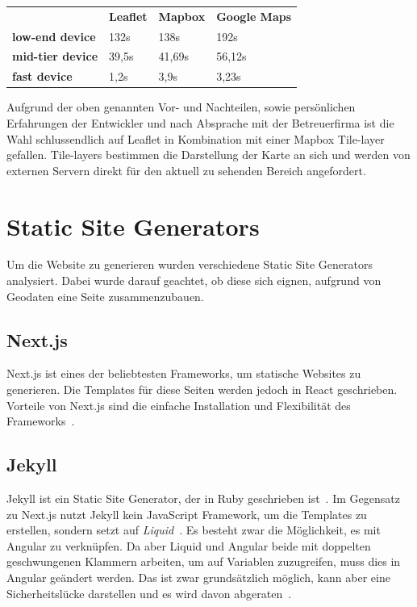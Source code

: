 \begin{table}[hbt!]
    \centering
    \begin{tabular}{llll}
        & \textbf{Leaflet} & \textbf{Mapbox} & \textbf{Google Maps} \\
        \textbf{low-end device}  & 132s             & 138s            & 192s                 \\
        \textbf{mid-tier device} & 39,5s            & 41,69s          & 56,12s               \\
        \textbf{fast device}     & 1,2s             & 3,9s            & 3,23s
    \end{tabular}\label{tab:map-framework-table}
\end{table}

Aufgrund der oben genannten Vor- und Nachteilen, sowie persönlichen Erfahrungen der Entwickler und nach Absprache mit der
Betreuerfirma ist die Wahl schlussendlich auf Leaflet in Kombination mit einer Mapbox Tile-layer gefallen.
Tile-layers bestimmen die Darstellung der Karte an sich und werden von externen Servern direkt für den aktuell zu sehenden Bereich angefordert.

\cleardoublepage

\section{Static Site Generators}
Um die Website zu generieren wurden verschiedene Static Site Generators analysiert.
Dabei wurde darauf geachtet, ob diese sich eignen, aufgrund von Geodaten eine Seite zusammenzubauen.

\subsection{Next.js}
Next.js ist eines der beliebtesten Frameworks, um statische Websites zu generieren.
Die Templates für diese Seiten werden jedoch in React geschrieben.
Vorteile von Next.js sind die einfache Installation und Flexibilität des Frameworks~\cite{nextjs}.

\subsection{Jekyll}
Jekyll ist ein Static Site Generator, der in Ruby geschrieben ist~\cite{jekyll-ruby}.
Im Gegensatz zu Next.js nutzt Jekyll kein JavaScript Framework, um die Templates zu erstellen, sondern setzt
auf \textit{Liquid}~\cite{jekyll-liquid}.
Es besteht zwar die Möglichkeit, es mit Angular zu verknüpfen.
Da aber Liquid und Angular beide mit doppelten geschwungenen Klammern arbeiten, um auf Variablen zuzugreifen, muss
dies in Angular geändert werden.
Das ist zwar grundsätzlich möglich, kann aber eine Sicherheitslücke darstellen und es wird davon abgeraten~\cite{angular-interpolation}.

